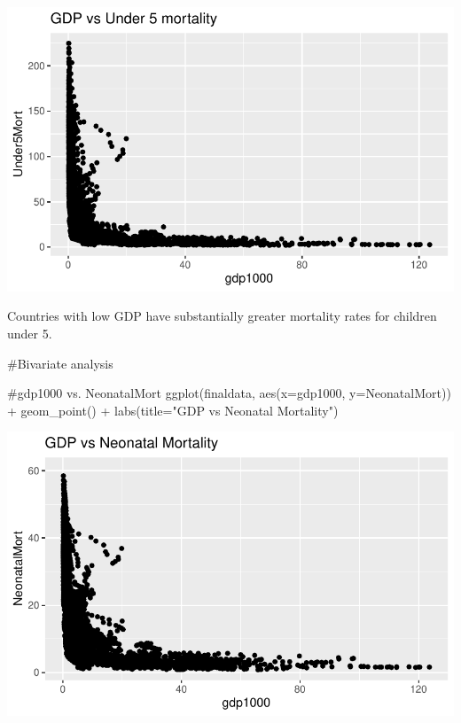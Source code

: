 \documentclass[
  letterpaper,
  DIV=11,
  numbers=noendperiod]{scrartcl}
\newenvironment{Shaded}{\begin{snugshade}}{\end{snugshade}}
\newcommand{\AttributeTok}[1]{\textcolor[rgb]{0.40,0.45,0.13}{#1}}
\newcommand{\CommentTok}[1]{\textcolor[rgb]{0.37,0.37,0.37}{#1}}
\newcommand{\FunctionTok}[1]{\textcolor[rgb]{0.28,0.35,0.67}{#1}}
\newcommand{\NormalTok}[1]{\textcolor[rgb]{0.00,0.23,0.31}{#1}}
\newcommand{\SpecialCharTok}[1]{\textcolor[rgb]{0.37,0.37,0.37}{#1}}
\newcommand{\StringTok}[1]{\textcolor[rgb]{0.13,0.47,0.30}{#1}}
\begin{document}
\includegraphics{week4_eda_inclass_files/figure-pdf/unnamed-chunk-9-1.pdf}

Countries with low GDP have substantially greater mortality rates for
children under 5.

\begin{Shaded}
\begin{Highlighting}[]
\CommentTok{\#Bivariate analysis}

\CommentTok{\#gdp1000 vs. NeonatalMort}
\FunctionTok{ggplot}\NormalTok{(finaldata, }\FunctionTok{aes}\NormalTok{(}\AttributeTok{x=}\NormalTok{gdp1000, }\AttributeTok{y=}\NormalTok{NeonatalMort)) }\SpecialCharTok{+} 
  \FunctionTok{geom\_point}\NormalTok{() }\SpecialCharTok{+} 
  \FunctionTok{labs}\NormalTok{(}\AttributeTok{title=}\StringTok{"GDP vs Neonatal Mortality"}\NormalTok{)}
\end{Highlighting}
\end{Shaded}

\includegraphics{week4_eda_inclass_files/figure-pdf/unnamed-chunk-10-1.pdf}
\end{document}
